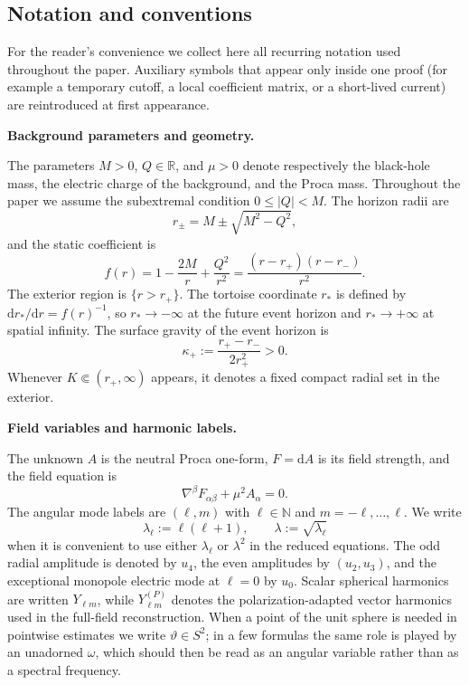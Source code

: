 \documentclass[12pt]{article}
\numberwithin{equation}{section}
\theoremstyle{plain}
\theoremstyle{definition}
\theoremstyle{remark}
\newcommand{\R}{\mathbb R}
\newcommand{\N}{\mathbb N}
\newcommand{\dd}{\mathrm d}
\newcommand{\la}{\lambda}
\newcommand{\abs}[1]{\left|#1\right|}
\begin{document}
\subsection{Notation and conventions}
For the reader's convenience we collect here all recurring notation used throughout the paper.  Auxiliary symbols that appear only inside one proof (for example a temporary cutoff, a local coefficient matrix, or a short-lived current) are reintroduced at first appearance.

\medskip\noindent\textbf{Background parameters and geometry.}\par\smallskip\noindent
The parameters $M>0$, $Q\in\R$, and $\mu>0$ denote respectively the black-hole mass, the electric charge of the background, and the Proca mass.  Throughout the paper we assume the subextremal condition $0\le \abs{Q}<M$.  The horizon radii are
\[
   r_\pm=M\pm\sqrt{M^2-Q^2},
\]
and the static coefficient is
\[
   f(r)=1-\frac{2M}{r}+\frac{Q^2}{r^2}=\frac{(r-r_+)(r-r_-)}{r^2}.
\]
The exterior region is $\{r>r_+\}$.  The tortoise coordinate $r_*$ is defined by $\dd r_*/\dd r=f(r)^{-1}$, so $r_*\to-\infty$ at the future event horizon and $r_*\to+\infty$ at spatial infinity.  The surface gravity of the event horizon is
\[
   \kappa_+:=\frac{r_+-r_-}{2r_+^2}>0.
\]
Whenever $K\Subset(r_+,\infty)$ appears, it denotes a fixed compact radial set in the exterior.

\medskip\noindent\textbf{Field variables and harmonic labels.}\par\smallskip\noindent
The unknown $A$ is the neutral Proca one-form, $F=\dd A$ is its field strength, and the field equation is
\[
   \nabla^\beta F_{\alpha\beta}+\mu^2A_\alpha=0.
\]
The angular mode labels are $(\ell,m)$ with $\ell\in\N$ and $m=-\ell,\dots,\ell$.  We write
\[
   \lambda_\ell:=\ell(\ell+1),
   \qquad
   \la:=\sqrt{\lambda_\ell}
\]
when it is convenient to use either $\lambda_\ell$ or $\la^2$ in the reduced equations.  The odd radial amplitude is denoted by $u_4$, the even amplitudes by $(u_2,u_3)$, and the exceptional monopole electric mode at $\ell=0$ by $u_0$.  Scalar spherical harmonics are written $Y_{\ell m}$, while $Y^{(P)}_{\ell m}$ denotes the polarization-adapted vector harmonics used in the full-field reconstruction.  When a point of the unit sphere is needed in pointwise estimates we write $\vartheta\in S^2$; in a few formulas the same role is played by an unadorned $\omega$, which should then be read as an angular variable rather than as a spectral frequency.
\end{document}
